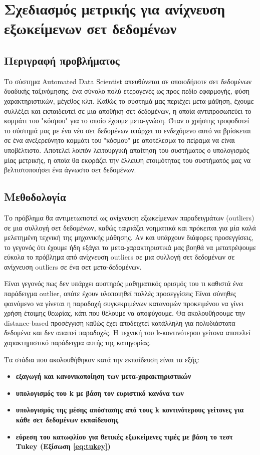 \section{Σχεδιασμός μετρικής για ανίχνευση εξωκείμενων σετ δεδομένων}
\subsection{Περιγραφή προβλήματος}
Το σύστημα Automated Data Scientist απευθύνεται σε οποιοδήποτε σετ δεδομένων δυαδικής ταξινόμησης. ένα σύνολο πολύ ετερογενές ως προς πεδίο εφαρμογής, φύση χαρακτηριστικών, μέγεθος κλπ. Καθώς το σύστημά μας περιέχει μετα-μάθηση, έχουμε συλλέξει και εκπαιδευτεί σε μια αποθήκη σετ δεδομένων, η οποία αντιπροσωπεύει το κομμάτι του "κόσμου" για το οποίο έχουμε μετα-γνώση. Όταν ο χρήστης τροφοδοτεί το σύστημά μας με ένα νέο σετ δεδομένων υπάρχει το ενδεχόμενο αυτό να βρίσκεται σε ένα ανεξερεύνητο κομμάτι του "κόσμου" με αποτέλεσμα το πείραμα να είναι υποβέλτιστο. Αποτελεί λοιπόν λειτουργική απαίτηση του συστήματος ο υπολογισμός μίας μετρικής, η οποία θα εκφράζει την έλλειψη ετοιμότητας του συστήματός μας να βελτιστοποιήσει ένα άγνωστο σετ δεδομένων.

\subsection{Μεθοδολογία}
Το πρόβλημα θα αντιμετωπιστεί ως ανίχνευση εξωκείμενων παραδειγμάτων (outliers) σε μια συλλογή  σετ δεδομένων, καθώς ταιριάζει νοηματικά και πρόκειται για μία καλά μελετημένη τεχνική της μηχανικής μάθησης. Αν και υπάρχουν διάφορες προσεγγίσεις, το γεγονός ότι έχουμε ήδη εξάγει τα μετα-χαρακτηριστικά μας βοηθά να μετατρέψουμε εύκολα το πρόβλημα από ανίχνευση outliers σε μια συλλογή σετ δεδομένων σε ανίχνευση outliers σε ένα σετ μετα-δεδομένων. 

Είναι γεγονός πως δεν υπάρχει αυστηρός μαθηματικός ορισμός του τι καθιστά ένα παράδειγμα outlier, οπότε έχουν υλοποιηθεί πολλές προσεγγίσεις Είναι σύνηθες φαινόμενο να γίνεται η παραδοχή συγκεκριμένων κατανομών προκειμένου να γίνει χρήση έτοιμης θεωρίας, κάτι που θέλουμε να αποφύγουμε. Θα ακολουθήσουμε την distance-based προσέγγιση \citep{Knorr:2000:DOA:764212.764218} καθώς έχει αποδειχτεί κατάλληλη για πολυδιάστατα δεδομένα και δεν απαιτεί παραδοχές.  Η τεχνική του k-κοντινότερου γείτονα αποτελεί χαρακτηριστικό παράδειγμα αυτής της κατηγορίας.

Τα στάδια που ακολουθήθηκαν κατά την εκπαίδευση είναι τα εξής:
\begin{itemize}
	\item \textbf{εξαγωγή και κανονικοποίηση των μετα-χαρακτηριστικών}
	\item \textbf{υπολογισμός του k με βάση τον ευριστικό κανόνα των \citet{Duda:2000:PC:954544}}
	\item \textbf{υπολογισμός της μέσης απόστασης από τους k κοντινότερους γείτονες για κάθε σετ δεδομένων εκπαίδευσης}
	\item \textbf{εύρεση του κατωφλίου για θετικές εξωκείμενες τιμές με βάση το τεστ Tukey (Εξίσωση \ref{eq:tukey})}
\end{itemize}

